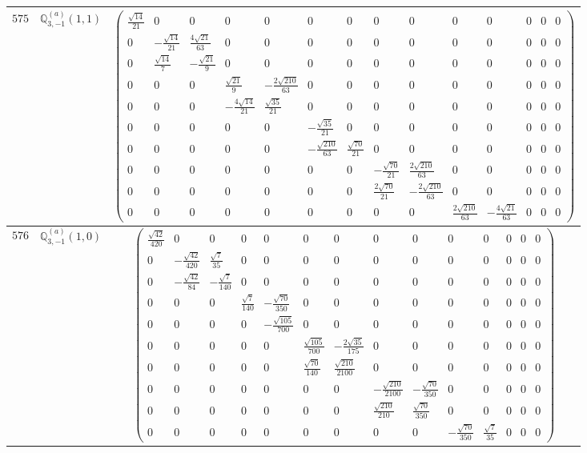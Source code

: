 \documentclass[fleqn,8pt,landscape]{jsarticle}
\begin{document}
\begin{center}
\begin{longtable}{ccc}
$ 575 $ & $ \mathbb{Q}_{3,-1}^{(a)}(1,1) $ & $ \begin{pmatrix} \frac{\sqrt{14}}{21} & 0 & 0 & 0 & 0 & 0 & 0 & 0 & 0 & 0 & 0 & 0 & 0 & 0 \\ 0 & - \frac{\sqrt{14}}{21} & \frac{4 \sqrt{21}}{63} & 0 & 0 & 0 & 0 & 0 & 0 & 0 & 0 & 0 & 0 & 0 \\ 0 & \frac{\sqrt{14}}{7} & - \frac{\sqrt{21}}{9} & 0 & 0 & 0 & 0 & 0 & 0 & 0 & 0 & 0 & 0 & 0 \\ 0 & 0 & 0 & \frac{\sqrt{21}}{9} & - \frac{2 \sqrt{210}}{63} & 0 & 0 & 0 & 0 & 0 & 0 & 0 & 0 & 0 \\ 0 & 0 & 0 & - \frac{4 \sqrt{14}}{21} & \frac{\sqrt{35}}{21} & 0 & 0 & 0 & 0 & 0 & 0 & 0 & 0 & 0 \\ 0 & 0 & 0 & 0 & 0 & - \frac{\sqrt{35}}{21} & 0 & 0 & 0 & 0 & 0 & 0 & 0 & 0 \\ 0 & 0 & 0 & 0 & 0 & - \frac{\sqrt{210}}{63} & \frac{\sqrt{70}}{21} & 0 & 0 & 0 & 0 & 0 & 0 & 0 \\ 0 & 0 & 0 & 0 & 0 & 0 & 0 & - \frac{\sqrt{70}}{21} & \frac{2 \sqrt{210}}{63} & 0 & 0 & 0 & 0 & 0 \\ 0 & 0 & 0 & 0 & 0 & 0 & 0 & \frac{2 \sqrt{70}}{21} & - \frac{2 \sqrt{210}}{63} & 0 & 0 & 0 & 0 & 0 \\ 0 & 0 & 0 & 0 & 0 & 0 & 0 & 0 & 0 & \frac{2 \sqrt{210}}{63} & - \frac{4 \sqrt{21}}{63} & 0 & 0 & 0 \end{pmatrix} $ \\ \hline
$ 576 $ & $ \mathbb{Q}_{3,-1}^{(a)}(1,0) $ & $ \begin{pmatrix} \frac{\sqrt{42}}{420} & 0 & 0 & 0 & 0 & 0 & 0 & 0 & 0 & 0 & 0 & 0 & 0 & 0 \\ 0 & - \frac{\sqrt{42}}{420} & \frac{\sqrt{7}}{35} & 0 & 0 & 0 & 0 & 0 & 0 & 0 & 0 & 0 & 0 & 0 \\ 0 & - \frac{\sqrt{42}}{84} & - \frac{\sqrt{7}}{140} & 0 & 0 & 0 & 0 & 0 & 0 & 0 & 0 & 0 & 0 & 0 \\ 0 & 0 & 0 & \frac{\sqrt{7}}{140} & - \frac{\sqrt{70}}{350} & 0 & 0 & 0 & 0 & 0 & 0 & 0 & 0 & 0 \\ 0 & 0 & 0 & 0 & - \frac{\sqrt{105}}{700} & 0 & 0 & 0 & 0 & 0 & 0 & 0 & 0 & 0 \\ 0 & 0 & 0 & 0 & 0 & \frac{\sqrt{105}}{700} & - \frac{2 \sqrt{35}}{175} & 0 & 0 & 0 & 0 & 0 & 0 & 0 \\ 0 & 0 & 0 & 0 & 0 & \frac{\sqrt{70}}{140} & \frac{\sqrt{210}}{2100} & 0 & 0 & 0 & 0 & 0 & 0 & 0 \\ 0 & 0 & 0 & 0 & 0 & 0 & 0 & - \frac{\sqrt{210}}{2100} & - \frac{\sqrt{70}}{350} & 0 & 0 & 0 & 0 & 0 \\ 0 & 0 & 0 & 0 & 0 & 0 & 0 & \frac{\sqrt{210}}{210} & \frac{\sqrt{70}}{350} & 0 & 0 & 0 & 0 & 0 \\ 0 & 0 & 0 & 0 & 0 & 0 & 0 & 0 & 0 & - \frac{\sqrt{70}}{350} & \frac{\sqrt{7}}{35} & 0 & 0 & 0 \end{pmatrix} $ \\ \hline

\end{longtable}
\end{center}
\end{document}
